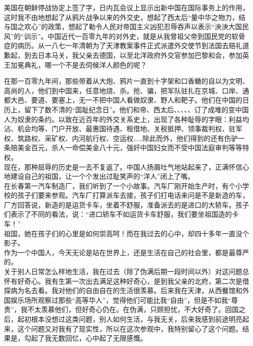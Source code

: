 美国在朝鲜停战协定上签了字，日内瓦会议上显示出新中国在国际事务上的作用，这时我不由地想起了从鸦片战争以来的外交史，想起了西太后“量中华之物力，结与国之欢心”的政策，想起了勒令人民对帝国主义凶犯忍辱吞声以表示“泱泱大国民风”的“训示”。中国近代一百零九年的对外史，就是从我曾祖父帝到国民党的软骨症的病历。从一八七一年清朝为了天津教案事件正式派遣外交使节到法国去赔礼道歉起，到去日本马关，我父亲去德国，以至北洋政府外交官参加巴黎和会，参加英王加冕典礼，哪一个不是去伺候洋人颜色的呢？

在那一百零九年间，那些带着从大炮、鸦片一直到十字架和口香糖的自以为文明、高尚的人，他们到中国来，任意地烧、杀。抢、骗，把军队驻扎在京城、口岸、通都大邑、要道、要塞上，无一不把中国人看做奴隶、野人和靶子。他们在中国的日历上，留下了数不清的“国耻纪念日”。他们和帝、西太后、、、、、订了成堆的变中国人为奴隶的条约。以致在近百年的外交关系史上，出现了各种耻辱的字眼：利益均沾、机会均等、门户开放、最惠国待遇、租借地、关税抵押、领事裁判权、驻军权、筑路权、采矿权、内河航行权、空运权……除此而外，他们得到的还有伤驴一条赔美金百元，杀人一命偿美金八十元，强奸中国妇女而不受中国法庭审判等等特权。\\

现在，那种屈辱的历史是一去不复返了。中国人扬眉吐气地站起来了，正满怀信心地建设自己的祖国，让一个个发出过耻笑声的“洋人”闭上了嘴。\\

在长春第一汽车制造厂，我们听到了一个小故事。汽车厂刚开始生产时，有个小学校的孩子们要来参观。汽车厂打算派车去接，孩子们打电话来问是不是新造的车，厂方回答说，新造的是运货卡车，坐着不舒服，准备派去的是进口的大轿车。孩子们表示了不同的看法，说：“进口轿车不如运货卡车舒服，我们要坐祖国造的卡车！”\\

祖国，她在孩子们的心里是如何崇高呵！而在我过去的心中，却四十多年一直没个影子。\\

作为一个中国人，今天无论是站在世界上，还是生活在自己的社会里，都是最尊严的。\\

关于别人日常怎么样地生活，我在过去（除了伪满后期一段时间以外）对这问题总怀有好奇心。我有生第一次出去满足这种好奇心，是到我父亲的北府，第二次是借探病为名去看。我对他们的自由自在的生活很羡慕。后来我在天津，从西餐馆和外国娱乐场所观察过那些“高等华人”，觉得他们可能比我“自由”，但是不如我“尊贵”，我不太羡慕他们，但好奇心仍在。在伪满，只顾担忧，不大好奇了。回国之后，起初根本没想过这类问题，别人如何生活，与我无关，后来我感到前途明亮起来，这个问题又对我有了现实性，所以在这次参观中，我特别留心了这个问题。结果是，勾起了我无数回忆，心中起了无限感慨。\\

